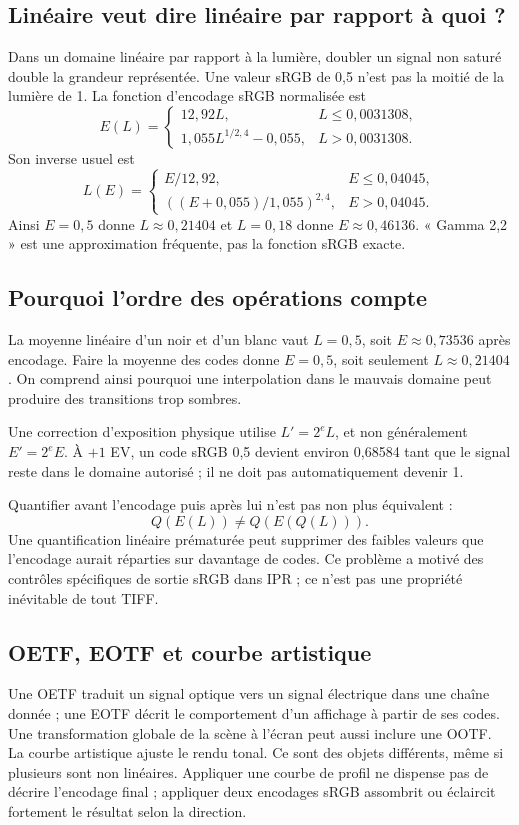 \subsection{Linéaire veut dire linéaire par rapport à quoi ?}
Dans un domaine linéaire par rapport à la lumière, doubler
un signal non saturé double la grandeur représentée. Une
valeur sRGB de 0,5 n'est pas la moitié de la lumière de 1.
La fonction d'encodage sRGB normalisée est~\cite{srgbimages}
\begin{equation}
E(L)=\begin{cases}
12{,}92L,&L\le0{,}0031308,\\
1{,}055L^{1/2{,}4}-0{,}055,&L>0{,}0031308.
\end{cases}
\end{equation}
Son inverse usuel est
\begin{equation}
L(E)=\begin{cases}
E/12{,}92,&E\le0{,}04045,\\
((E+0{,}055)/1{,}055)^{2{,}4},&E>0{,}04045.
\end{cases}
\end{equation}
Ainsi $E=0{,}5$ donne $L\approx0{,}21404$ et
$L=0{,}18$ donne $E\approx0{,}46136$. « Gamma 2,2 » est une
approximation fréquente, pas la fonction sRGB exacte.

\subsection{Pourquoi l'ordre des opérations compte}
La moyenne linéaire d'un noir et d'un blanc vaut $L=0{,}5$,
soit $E\approx0{,}73536$ après encodage. Faire la moyenne
des codes donne $E=0{,}5$, soit seulement $L\approx0{,}21404$.
On comprend ainsi pourquoi une interpolation dans le mauvais
domaine peut produire des transitions trop sombres.

Une correction d'exposition physique utilise
$L'=2^eL$, et non généralement $E'=2^eE$.
À $+1$ EV, un code sRGB 0,5 devient environ 0,68584
tant que le signal reste dans le domaine autorisé ; il ne
doit pas automatiquement devenir 1.

Quantifier avant l'encodage puis après lui n'est pas non
plus équivalent :
\[
Q(E(L))\ne Q(E(Q(L))).
\]
Une quantification linéaire prématurée peut supprimer des
faibles valeurs que l'encodage aurait réparties sur davantage
de codes. Ce problème a motivé des contrôles spécifiques
de sortie sRGB dans IPR ; ce n'est pas une propriété
inévitable de tout TIFF.

\subsection{OETF, EOTF et courbe artistique}
Une OETF traduit un signal optique vers un signal électrique
dans une chaîne donnée ; une EOTF décrit le comportement
d'un affichage à partir de ses codes. Une transformation
globale de la scène à l'écran peut aussi inclure une OOTF.
La courbe artistique ajuste le rendu tonal. Ce sont des
objets différents, même si plusieurs sont non linéaires.
Appliquer une courbe de profil ne dispense pas de décrire
l'encodage final ; appliquer deux encodages sRGB assombrit
ou éclaircit fortement le résultat selon la direction.

